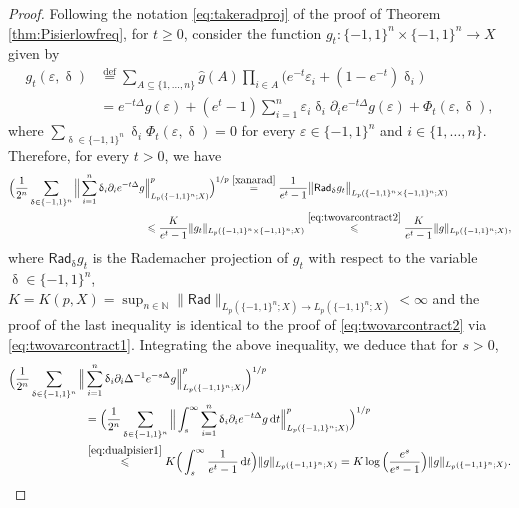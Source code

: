\documentclass[11pt,reqno]{amsart}
\renewcommand{\leq}{\leqslant}
\renewcommand{\geq}{\geqslant}
\newcommand{\e}{\varepsilon}
\newcommand{\1}{\mathbf 1}
\theoremstyle{remark}
\newcommand{\N}{\mathbb N}
\newcommand{\eqdef}{\stackrel{\mathrm{def}}{=}}
\renewcommand{\delta}{\updelta}
\newcommand*\diff{\mathop{}\!\mathrm{d}}
\newcommand{\msf}{\mathsf}
\begin{document}
\begin{proof}
Following the notation \eqref{eq:takeradproj} of the proof of Theorem \ref{thm:Pisierlowfreq}, for $t\geq0$, consider the function $g_t:\{-1,1\}^n\times\{-1,1\}^n\to X$ given by
\begin{equation} \label{xanarad}
\begin{split}
g_t(\e,\delta) & \eqdef \sum_{A\subseteq\{1,\ldots,n\}} \widehat{g}(A)  \prod_{i\in A} \big( e^{-t} \e_i + (1-e^{-t}) \delta_i\big)
\\ & = e^{-t\Delta} g(\e) + (e^t-1) \sum_{i=1}^n \e_i\delta_i\partial_i e^{-t\Delta}g(\e) + \Phi_{t}(\e,\delta),
\end{split}
\end{equation}
where $\sum_{\delta\in\{-1,1\}^n} \delta_i \Phi_{t}(\e,\delta)=0$ for every $\e\in\{-1,1\}^n$ and $i\in\{1,\ldots,n\}$. Therefore, for every $t>0$, we have
\begin{equation} \label{eq:dualpisier1}
\begin{split}
\Big(\frac{1}{2^n}\sum_{\delta\in\{-1,1\}^n} \Big\| \sum_{i=1}^n\delta_i\partial_i e^{-t\Delta} g&\Big\|^p_{L_p(\{-1,1\}^n;X)} \Big)^{1/p} 
 \stackrel{\eqref{xanarad}}{=} \frac{1}{e^t-1} \big\| \msf{Rad}_\delta g_t \big\|_{L_p(\{-1,1\}^n\times\{-1,1\}^n;X)}
\\ & \leq \frac{K}{e^t-1} \|g_t\|_{L_p(\{-1,1\}^n\times\{-1,1\}^n;X)} \stackrel{\eqref{eq:twovarcontract2}}{\leq} \frac{K}{e^t-1} \|g\|_{L_p(\{-1,1\}^n;X)},
\end{split}
\end{equation}
where $\msf{Rad}_\delta g_t$ is the Rademacher projection of $g_t$ with respect to the variable $\delta\in\{-1,1\}^n$, $K=K(p,X) = \sup_{n\in\N} \|\msf{Rad}\|_{L_p(\{-1,1\}^n;X)\to L_p(\{-1,1\}^n;X)} < \infty$ and the proof of the last inequality is identical to the proof of \eqref{eq:twovarcontract2} via \eqref{eq:twovarcontract1}. Integrating the above inequality, we deduce that for $s>0$,
\begin{equation} \label{eq:dualpisier1.5}
\begin{split}
\Big(\frac{1}{2^n}\sum_{\delta\in\{-1,1\}^n} \Big\| &\sum_{i=1}^n\delta_i\partial_i \Delta^{-1} e^{-s\Delta} g\Big\|_{L_p(\{-1,1\}^n;X)}^p \Big)^{1/p} 
\\ & = \Big(\frac{1}{2^n}\sum_{\delta\in\{-1,1\}^n} \Big\| \int_s^\infty \sum_{i=1}^n\delta_i\partial_i e^{-t\Delta} g \diff t\Big\|^p_{L_p(\{-1,1\}^n;X)} \Big)^{1/p} 
\\ & \stackrel{\eqref{eq:dualpisier1}}{\leq} K \Big(\int_s^\infty \frac{1}{e^t-1}\diff t\Big) \|g\|_{L_p(\{-1,1\}^n;X)} = K \log\Big(\frac{e^s}{e^s-1}\Big) \|g\|_{L_p(\{-1,1\}^n;X)}.

\end{split}
\end{equation}
\end{proof}
\end{document}
